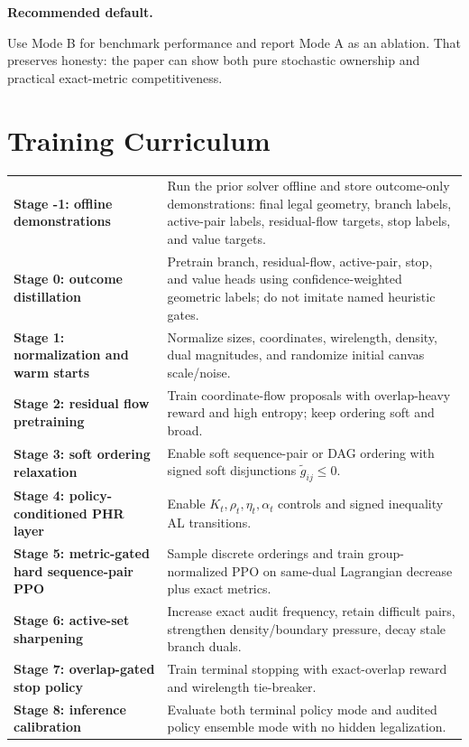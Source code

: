 \documentclass[11pt]{article}
\newcommand{\callout}[3]{%
\medskip\noindent\textbf{\textcolor{#1}{#2.}}\par\noindent #3\par\medskip
}
\begin{document}
\callout{purple!70!black}{Recommended default}{Use Mode B for benchmark performance and report Mode A as an ablation. That preserves honesty: the paper can show both pure stochastic ownership and practical exact-metric competitiveness.}

\section{Training Curriculum}

\begin{center}
\small
\begin{tabularx}{\textwidth}{>{\bfseries\color{navy}}p{}Y}
Stage -1: offline demonstrations & Run the prior solver offline and store outcome-only demonstrations: final legal geometry, branch labels, active-pair labels, residual-flow targets, stop labels, and value targets. \\
Stage 0: outcome distillation & Pretrain branch, residual-flow, active-pair, stop, and value heads using confidence-weighted geometric labels; do not imitate named heuristic gates. \\
Stage 1: normalization and warm starts & Normalize sizes, coordinates, wirelength, density, dual magnitudes, and randomize initial canvas scale/noise. \\
Stage 2: residual flow pretraining & Train coordinate-flow proposals with overlap-heavy reward and high entropy; keep ordering soft and broad. \\
Stage 3: soft ordering relaxation & Enable soft sequence-pair or DAG ordering with signed soft disjunctions $\widetilde g_{ij}\le0$. \\
Stage 4: policy-conditioned PHR layer & Enable $K_t,\rho_t,\eta_t,\alpha_t$ controls and signed inequality AL transitions. \\
Stage 5: metric-gated hard sequence-pair PPO & Sample discrete orderings and train group-normalized PPO on same-dual Lagrangian decrease plus exact metrics. \\
Stage 6: active-set sharpening & Increase exact audit frequency, retain difficult pairs, strengthen density/boundary pressure, decay stale branch duals. \\
Stage 7: overlap-gated stop policy & Train terminal stopping with exact-overlap reward and wirelength tie-breaker. \\
Stage 8: inference calibration & Evaluate both terminal policy mode and audited policy ensemble mode with no hidden legalization. \\
\end{tabularx}
\end{center}
\end{document}

